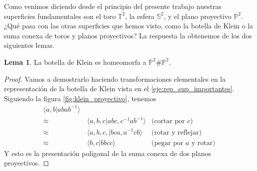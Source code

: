 \documentclass[10pt]{report}
\newcommand{\Esfera}{\mathbb{S}^2}
\newcommand{\Toro}{\mathbb{T}^2}
\newcommand{\Proyectivo}{\mathbb{P}^2}
\theoremstyle{definition}
\newtheorem{lema}[defin]{Lema}
\begin{document}
Como venimos diciendo desde el principio del presente trabajo nuestras superficies fundamentales son el toro $\Toro$, la esfera $ \Esfera$, y el plano proyectivo  $\Proyectivo$. ¿Qué pasa con las otras superficies que hemos visto, como la botella de Klein o la suma conexa de toros y planos proyectivos? La respuesta la obtenemos de los dos siguientes lemas.

\begin{lema}\label{lema:klein_proyectivoproyectivo}
La botella de Klein es homeomorfa a $\Proyectivo \# \Proyectivo$.
\end{lema}
\begin{proof}
Vamos a demostrarlo haciendo transformaciones elementales en la representación de la botella de Klein vista en el \autoref{eje:rep_sup_importantes}. 
Siguiendo la figura \autoref{fig:klein_proyectivo}, tenemos
\begin{align*}
\langle a,b| abab^{-1}\rangle & & \\
\approx & \, \langle a,b,c|abc, c^{-1}ab^{-1}\rangle &\text{(cortar por } c\text{)}\\
\approx & \, \langle a,b,c,|bca,a^{-1}cb\rangle &\text{(rotar y reflejar)}\\
\approx & \, \langle b,c|bbcc\rangle &\text{(pegar por } a \text{ y rotar)}
\end{align*}
Y esto es la presentación poligonal de la suma conexa de dos planos proyectivos.
\end{proof}
\end{document}
